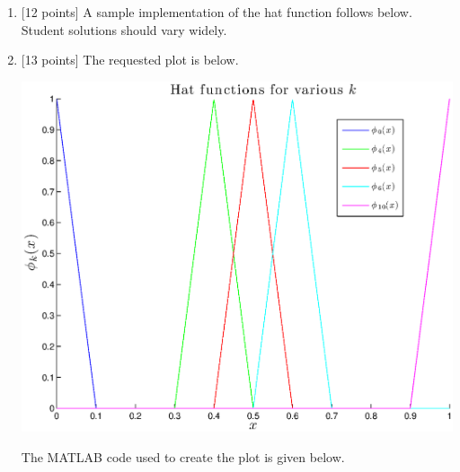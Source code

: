 \begin{solution}
\begin{enumerate}
\item {[12 points]}
A sample implementation of the hat function follows below. Student solutions should vary widely. 



\item {[13 points]}
The requested plot is below.

\begin{center}
\includegraphics[scale=0.7]{hatfxnsplot.eps}
\end{center}

The MATLAB code used to create the plot is given below.



\end{enumerate}
\end{solution}

